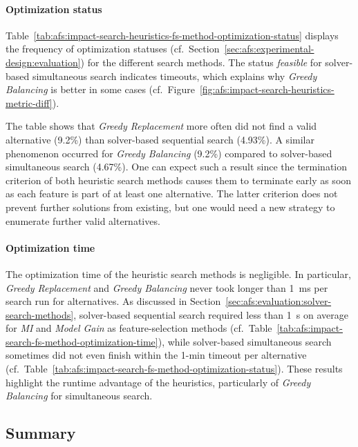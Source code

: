 \documentclass{article}
\theoremstyle{definition}
\begin{document}
\paragraph{Optimization status}

Table~\ref{tab:afs:impact-search-heuristics-fs-method-optimization-status} displays the frequency of optimization statuses (cf.~Section~\ref{sec:afs:experimental-design:evaluation}) for the different search methods.
The status \emph{feasible} for solver-based simultaneous search indicates timeouts, which explains why \emph{Greedy Balancing} is better in some cases (cf.~Figure~\ref{fig:afs:impact-search-heuristics-metric-diff}).

The table shows that \emph{Greedy Replacement} more often did not find a valid alternative (9.2\%) than solver-based sequential search (4.93\%).
A similar phenomenon occurred for \emph{Greedy Balancing} (9.2\%) compared to solver-based simultaneous search (4.67\%).
One can expect such a result since the termination criterion of both heuristic search methods causes them to terminate early as soon as each feature is part of at least one alternative.
The latter criterion does not prevent further solutions from existing, but one would need a new strategy to enumerate further valid alternatives.

\paragraph{Optimization time}

The optimization time of the heuristic search methods is negligible.
In particular, \emph{Greedy Replacement} and \emph{Greedy Balancing} never took longer than 1~ms per search run for alternatives.
As discussed in Section~\ref{sec:afs:evaluation:solver-search-methods}, solver-based sequential search required less than 1~s on average for \emph{MI} and \emph{Model Gain} as feature-selection methods (cf.~Table~\ref{tab:afs:impact-search-fs-method-optimization-time}), while solver-based simultaneous search sometimes did not even finish within the 1-min timeout per alternative (cf.~Table~\ref{tab:afs:impact-search-fs-method-optimization-status}).
These results highlight the runtime advantage of the heuristics, particularly of \emph{Greedy Balancing} for simultaneous search.

\subsection{Summary}
\label{sec:afs:evaluation:summary}
\end{document}
